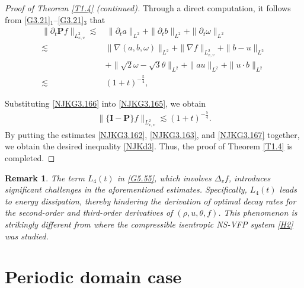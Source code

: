 \documentclass[reqno,11pt]{amsart}
\theoremstyle{plain}
\newtheorem{rem}{Remark}[section]
\numberwithin{equation}{section}
\begin{document}
\begin{proof}[Proof of Theorem \ref{T1.4} \emph{(}continued\emph{)}]
Through a direct computation, it follows from \eqref{G3.21}$_1$–\eqref{G3.21}$_3$ that  
\begin{align}\label{NJKG3.166}
\|\partial_t{\mathbf{P}f} \|_{L_{x,v}^2}\lesssim&\, \|\partial_t a\|_{L^2}+ 
  \|\partial_t b\|_{L^2} +\|\partial_t \omega\|_{L^2}\nonumber\\
\lesssim\,&\|\nabla (a,b,\omega)\|_{L^2}+\|\nabla f\|_{L_{x,v}^2}+\|b-u\|_{L^2}\nonumber\\
& +\|\sqrt{2}\omega-\sqrt{3}\theta\|_{L^2}+\|au\|_{L^2}+\|u\cdot b\|_{L^2}\nonumber\\
\lesssim\,& (1+t)^{-\frac{5}{4}},
\end{align}

Substituting \eqref{NJKG3.166} into \eqref{NJKG3.165}, we obtain 
\begin{align}\label{NJKG3.167}
 \|\{\mathbf{I}-\mathbf{P}\}f\|_{L_{x,v}^2} \lesssim (1+t)^{-\frac{5}{4}}.   
\end{align}
By putting the estimates \eqref{NJKG3.162}, \eqref{NJKG3.163}, 
and \eqref{NJKG3.167} together, we obtain the desired  inequality \eqref{NJKd3}.
 Thus, the proof of Theorem \ref{T1.4} is completed.  
\end{proof}

\begin{rem}
The term $L_4(t)$ in \eqref{G5.55}, which involves $\Delta_v f$, 
introduces significant challenges in the aforementioned estimates.
 Specifically,  $L_4(t)$ leads to energy dissipation, thereby 
 hindering the derivation of optimal decay rates for the second-order 
 and third-order derivatives of $(\rho, u, \theta, f)$. This phenomenon 
is strikingly different from \cite{Ww-CMS-2024} where the  
compressible isentropic NS-VFP system \eqref{H2}  was studied.
\end{rem}


\section{Periodic domain case} 
\end{document}
